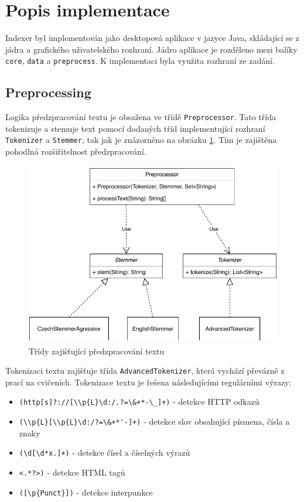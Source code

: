 \documentclass[11pt,a4paper]{scrartcl}
\begin{document}
	\section{Popis implementace}
	Indexer byl implementován jako desktopová aplikace v jazyce Java, skládající se z jádra a grafického uživatelského rozhraní. Jádro aplikace je rozděleno mezi balíky \verb|core|, \verb|data| a \verb|preprocess|. K implementaci byla využita rozhraní ze zadání. 
	
	\subsection{Preprocessing}
	Logika předzpracování textu je obsažena ve třídě \verb|Preprocessor|. Tato třída tokenizuje a stemuje text pomocí dodaných tříd implementující rozhraní \verb|Tokenizer| a \verb|Stemmer|, tak jak je znázorněno na obrázku \ref{fig:preproc-uml}. Tím je zajištěna pohodlná rozšiřitelnost předzpracování.
	
	\begin{figure}[!h]
		\centering
		\includegraphics[height=8cm]{preproc-uml}
		\caption{Třídy zajišťující předzpracování textu}
		\label{fig:preproc-uml}
	\end{figure}

	Tokenizaci textu zajišťuje třída \verb|AdvancedTokenizer|, která vychází převázně z prací na cvičeních. Tokenizace textu je řešena následujícími regulárními výrazy:
	
	\begin{itemize}
		\item \verb|(http[s]?://[\\p{L}\d:/.?=\&+*-\_]+)| - detekce HTTP odkazů
		\item \verb|(\\p{L}[\\p{L}\d:/?=\&+*'-]+)| - detekce slov obsahující písmena, čísla a znaky
		\item \verb|(\d[\d*x.]+)| - detekce čísel a číselných výrazů
		\item \verb|<.*?>)| - detekce HTML tagů
		\item \verb|([\p{Punct}])| - detekce interpunkce
	\end{itemize}
	
\end{document}
